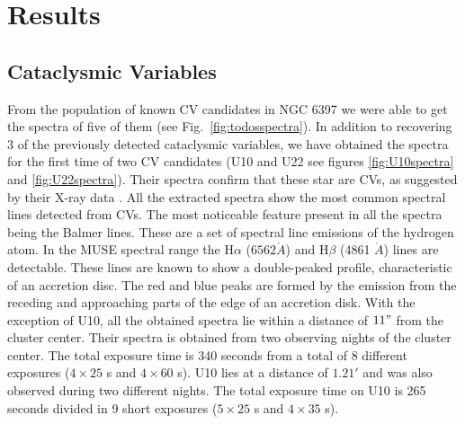 \chapter{Results}\label{chap:results}
\thispagestyle{fancy}

\section{Cataclysmic Variables }
From the population of known CV candidates in NGC 6397 we were able to get the spectra of five of them (see Fig.~\ref{fig:todosspectra}). In addition to recovering 3 of the previously detected cataclysmic variables, we have obtained the spectra for the first time of two CV candidates (U10 and U22 see figures \ref{fig:U10spectra} and \ref{fig:U22spectra}). Their spectra confirm that these star are CVs, as suggested by their X-ray data \citep{grindlay_chandra_2001}. All the extracted spectra show the most common spectral lines detected from CVs. The most noticeable feature present in all the spectra being the Balmer lines. These are a set of spectral line emissions of the hydrogen atom. In the MUSE spectral range the H$\alpha$ ($6562 \mathring{A}$) and H$\beta$ (4861 $\mathring{A}$) lines are detectable. These lines are known to show a double-peaked profile, characteristic of an accretion disc. The red and blue peaks are formed by the emission from the receding and approaching parts of the edge of an accretion disk. With the exception of U10, all the obtained spectra lie within a distance of $11"$ from the cluster center. Their spectra is obtained from two observing nights of the cluster center. The total exposure time is 340 seconds from a total of 8 different exposures ($4 \times 25$ s and $4 \times 60$ s). U10 lies at a distance of $1.21'$ and was also observed during two different nights. The total exposure time on U10 is 265 seconds divided in 9 short exposures ($5 \times 25$ s and $4 \times 35$ s). 

